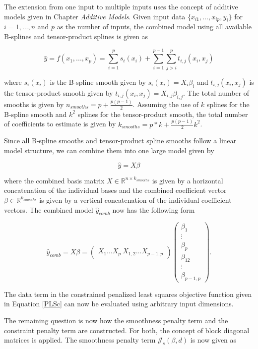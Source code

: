 The extension from one input to multiple inputs uses the concept of additive models given in Chapter \emph{Additive Models}. Given input data $\{ x_{i1}, \dots, x_{ip}, y_i\}$ for $i = 1, \dots, n$ and $p$ as the number of inputs, the combined model using all available B-splines and tensor-product splines is given as

$$\hat y = f(x_1,..., x_p) = \sum_{i=1}^p s_i(x_i) + \sum_{i=1}^{p-1} \sum_{j>i}^p t_{i,j}(x_i, x_j) $$

where $s_i(x_i)$ is the B-spline smooth given by $s_i(x_i) = X_i \beta_i$ and $t_{i, j}(x_i,x_j)$ is the tensor-product smooth given by $t_{i, j}(x_i,x_j) = X_{i,j} \beta_{i,j}$. The total number of smooths is given by $n_{smooths} = p + \frac{p(p-1)}{2}$.  Assuming the use of $k$ splines for the B-spline smooth and $k^2$ splines for the tensor-product smooth, the total number of coefficients to estimate is given by $k_{smooths} = p*k + \frac{p(p-1)}{2}k^2$. \cite{fahrmeir2013regression}

Since all B-spline smooths and tensor-product spline smooths follow a linear model structure, we can combine them into one large model given by

$$\hat y = X \beta$$

where the combined basis matrix $X \in \mathbb{R}^{n \times k_{smooths}}$ is given by a horizontal concatenation of the individual bases and the combined coefficient vector $\beta \in \mathbb{R}^{k_{smooths}}$ is given by a vertical concatenation of the individual coefficient vectors. The combined model $\hat y_{comb}$ now has the following form
	
$$\hat y_{comb} = X \beta = \begin{pmatrix} X_1 \dots X_p \ X_{1,2} \dots X_{p-1,p}\end{pmatrix} \begin{pmatrix} \beta_1 \\ \vdots \\ \beta_p \\ \beta_{12} \\ \vdots \\ \beta_{p-1, p}  \end{pmatrix}.$$

The data term in the constrained penalized least squares objective function given in Equation \ref{PLSc} can now be evaluated using arbitrary input dimensions. 

The remaining question is now how the smoothness penalty term and the constraint penalty term are constructed. For both, the concept of block diagonal matrices is applied. The smoothness penalty term $\mathcal J_s(\beta, d)$ is now given as

